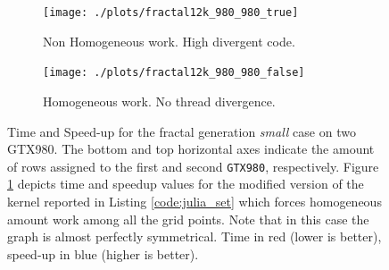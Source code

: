 \begin{figure}
    \begin{subfigure}{1.0\textwidth}
        \caption{Non Homogeneous work. High divergent code.}
        \texttt{[image: ./plots/fractal12k\_980\_980\_true]}
        \label{fig:fractal12k_980_980_false}
    \end{subfigure}        
    \endminipage \hfill
     \vspace{5mm}
    \begin{subfigure}{1.0\textwidth}
        \caption{Homogeneous work. No thread divergence.}
        \texttt{[image: ./plots/fractal12k\_980\_980\_false]}

\label{fig:fractal12k_980_980_true}
    \end{subfigure}
    \endminipage\hfill
    \caption[Time and Speed-up for the fractal generation \textit{small} case on two GTX980.]{Time and Speed-up for the fractal generation \textit{small} case on two GTX980. The bottom and top horizontal axes indicate the amount of rows assigned to the first and second \texttt{GTX980}, respectively. Figure \ref{fig:fractal12k_980_980_false} depicts time and speedup values for the modified version of the kernel reported in Listing \ref{code:julia_set} which forces homogeneous amount work among all the grid points. Note that in this case the graph is almost perfectly symmetrical. Time in red (lower is better), speed-up in blue (higher is better).}
    \label{fig:fractal12k_980_980}
\end{figure}



